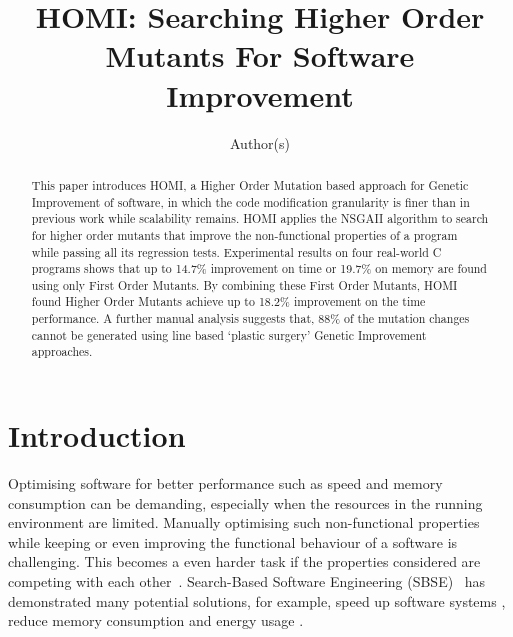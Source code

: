 \documentclass[oribibl]{llncs}
\begin{document}
\title{HOMI: Searching Higher Order Mutants For Software Improvement}

\author{Author(s)
}



\maketitle

\begin{abstract}

This paper introduces HOMI, a Higher Order Mutation based approach for Genetic Improvement of software,
in which the code modification granularity is finer than in previous work while scalability remains.
HOMI applies the NSGAII algorithm to search for higher order mutants that improve the non-functional properties of a program while passing all its regression tests.
Experimental results on four real-world C programs shows
that up to 14.7\% improvement on time or 19.7\% on memory are found using only First Order Mutants.
By combining these First Order Mutants, HOMI found Higher Order Mutants achieve up to 18.2\% improvement on the time performance.
A further manual analysis suggests that, 88\% of the mutation changes cannot be generated using line based `plastic surgery' Genetic Improvement approaches.
\end{abstract}

\section{Introduction}
\label{sec_intro}

Optimising software for better performance such as speed and memory consumption can be demanding, especially when the resources in the running environment are limited.
Manually optimising such non-functional properties while keeping or even improving the functional behaviour of a software is challenging. This becomes a even harder task if the properties considered are competing with each other~\cite{Harman:2012:GCC:2351676.2351678}. Search-Based Software Engineering (SBSE)~\cite{Harman2001833} has demonstrated many potential solutions, for example, speed up software systems \cite{5688317, Langdon:2014:IMI:2576768.2598244}, reduce memory consumption \cite{Wu:2015:DPO:2739480.2754648} and energy usage \cite{Bruce:2015:REC:2739480.2754752}.
\end{document}
